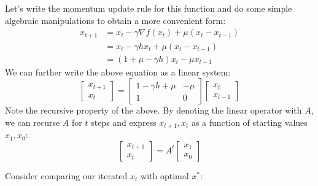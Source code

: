 \documentclass{article}
\begin{document}
Let's write the momentum update rule for this function and do some simple algebraic manipulations to obtain a more convenient form:
\begin{align*}
    x_{t+1} &= x_t - \gamma \nabla f(x_t) + \mu(x_t - x_{t-1}) \\
    &= x_t - \gamma h x_t + \mu(x_t - x_{t-1}) \\
    &= (1 + \mu - \gamma h)x_t - \mu x_{t-1}
\end{align*}
We can further write the above equation as a linear system:
\begin{equation}
	\begin{bmatrix}x_{t+1}\\x_{t}\end{bmatrix} = \begin{bmatrix}1-\gamma h + \mu &-\mu \\1&0\end{bmatrix}\begin{bmatrix}x_{t}\\x_{t-1}\end{bmatrix} 
\end{equation}
Note the recursive property of the above. By denoting the linear operator with $A$, we can recurse $A$ for $t$ steps and express $x_{t+1}, x_t$ as a function of starting values $x_1, x_0$:
\begin{equation}
\begin{bmatrix}x_{t+1}\\x_{t}\end{bmatrix} = A^t\begin{bmatrix} x_{1}\\x_{0}\end{bmatrix} 
\end{equation}


Consider comparing our iterated $x_t$ with optimal $x^*$:
\end{document}
